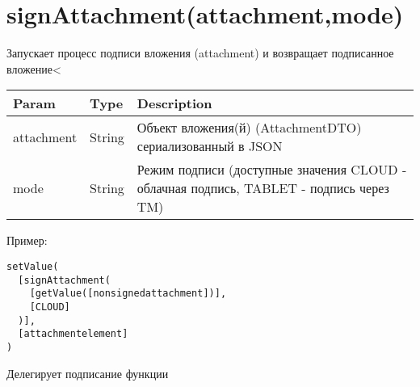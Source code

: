 \hypertarget{attachment-mode}{%
\section{signAttachment(attachment,mode)}\label{attachment-mode}}

Запускает процесс подписи вложения (attachment) и возвращает подписанное
вложение\textless{}


\begin{longtable}[]{@{}lll@{}}
\toprule
\begin{minipage}[b]{0.30\columnwidth}\raggedright
Param\strut
\end{minipage} & \begin{minipage}[b]{0.30\columnwidth}\raggedright
Type\strut
\end{minipage} & \begin{minipage}[b]{0.30\columnwidth}\raggedright
Description\strut
\end{minipage}\tabularnewline
\midrule
\endhead
\begin{minipage}[t]{0.30\columnwidth}\raggedright
attachment\strut
\end{minipage} & \begin{minipage}[t]{0.30\columnwidth}\raggedright
String\strut
\end{minipage} & \begin{minipage}[t]{0.30\columnwidth}\raggedright
Объект вложения(й) (AttachmentDTO) сериализованный в JSON\strut
\end{minipage}\tabularnewline
\begin{minipage}[t]{0.30\columnwidth}\raggedright
mode\strut
\end{minipage} & \begin{minipage}[t]{0.30\columnwidth}\raggedright
String\strut
\end{minipage} & \begin{minipage}[t]{0.30\columnwidth}\raggedright
Режим подписи (доступные значения CLOUD - облачная подпись, TABLET -
подпись через TM)\strut
\end{minipage}\tabularnewline
\bottomrule
\end{longtable}

Пример:

\begin{verbatim}
setValue(
  [signAttachment(
    [getValue([nonsignedattachment])],
    [CLOUD]
  )],
  [attachmentelement]
)
\end{verbatim}

Делегирует подписание функции 

